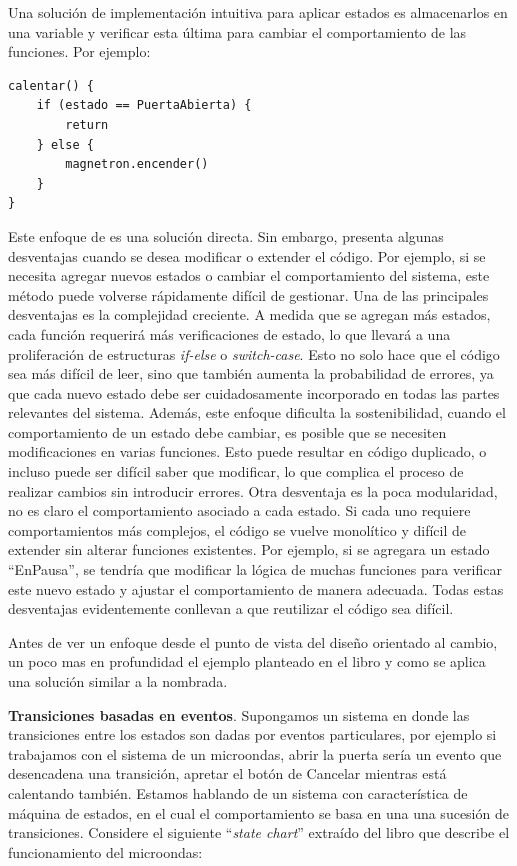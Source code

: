 Una solución de implementación intuitiva para aplicar estados es almacenarlos en una variable y verificar esta última para cambiar el comportamiento de las funciones. Por ejemplo:

\begin{lstlisting}
calentar() {
    if (estado == PuertaAbierta) {
        return
    } else {
        magnetron.encender()
    }
}
\end{lstlisting}

Este enfoque de es una solución directa. Sin embargo, presenta algunas desventajas cuando se desea modificar o extender el código. Por ejemplo, si se necesita agregar nuevos estados o cambiar el comportamiento del sistema, este método puede volverse rápidamente difícil de gestionar. Una de las principales desventajas es la complejidad creciente. A medida que se agregan más estados, cada función requerirá más verificaciones de estado, lo que llevará a una proliferación de estructuras \textit{if-else} o \textit{switch-case}. Esto no solo hace que el código sea más difícil de leer, sino que también aumenta la probabilidad de errores, ya que cada nuevo estado debe ser cuidadosamente incorporado en todas las partes relevantes del sistema. Además, este enfoque dificulta la sostenibilidad, cuando el comportamiento de un estado debe cambiar, es posible que se necesiten modificaciones en varias funciones. Esto puede resultar en código duplicado, o incluso puede ser difícil saber que modificar, lo que complica el proceso de realizar cambios sin introducir errores. Otra desventaja es la poca modularidad, no es claro el comportamiento asociado a cada estado. Si cada uno requiere comportamientos más complejos, el código se vuelve monolítico y difícil de extender sin alterar funciones existentes. Por ejemplo, si se agregara un estado ``EnPausa'', se tendría que modificar la lógica de muchas funciones para verificar este nuevo estado y ajustar el comportamiento de manera adecuada. Todas estas desventajas evidentemente conllevan a que reutilizar el código sea difícil.

Antes de ver un enfoque desde el punto de vista del diseño orientado al cambio, un poco mas en profundidad el ejemplo planteado en el libro y como se aplica una solución similar a la nombrada.

\textbf{Transiciones basadas en eventos}. Supongamos un sistema en donde las transiciones entre los estados son dadas por eventos particulares, por ejemplo si trabajamos con el sistema de un microondas, abrir la puerta sería un evento que desencadena una transición, apretar el botón de Cancelar mientras está calentando también. Estamos hablando de un sistema con característica de máquina de estados, en el cual el comportamiento se basa en una una sucesión de transiciones. Considere el siguiente ``\textit{state chart}'' extraído del libro que describe el funcionamiento del microondas:


